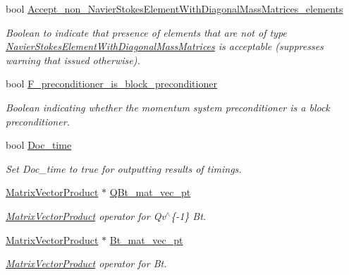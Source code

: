 \begin{DoxyCompactItemize}
bool \hyperlink{classoomph_1_1NavierStokesSchurComplementPreconditioner_a31a0119eae85695e267b2b0e6d58cfe6}{Accept\+\_\+non\+\_\+\+Navier\+Stokes\+Element\+With\+Diagonal\+Mass\+Matrices\+\_\+elements}
\begin{DoxyCompactList}\small\item\em Boolean to indicate that presence of elements that are not of type \hyperlink{classoomph_1_1NavierStokesElementWithDiagonalMassMatrices}{Navier\+Stokes\+Element\+With\+Diagonal\+Mass\+Matrices} is acceptable (suppresses warning that issued otherwise). \end{DoxyCompactList}\item 
bool \hyperlink{classoomph_1_1NavierStokesSchurComplementPreconditioner_ad3e3b6635c1524d8413a75642e4bc4e1}{F\+\_\+preconditioner\+\_\+is\+\_\+block\+\_\+preconditioner}
\begin{DoxyCompactList}\small\item\em Boolean indicating whether the momentum system preconditioner is a block preconditioner. \end{DoxyCompactList}\item 
bool \hyperlink{classoomph_1_1NavierStokesSchurComplementPreconditioner_a0b551f53464a6331d3b0f3da61d712ff}{Doc\+\_\+time}
\begin{DoxyCompactList}\small\item\em Set Doc\+\_\+time to true for outputting results of timings. \end{DoxyCompactList}\item 
\hyperlink{classoomph_1_1MatrixVectorProduct}{Matrix\+Vector\+Product} $\ast$ \hyperlink{classoomph_1_1NavierStokesSchurComplementPreconditioner_a7d88aae7807a9a8d07491dda4c8c2465}{Q\+Bt\+\_\+mat\+\_\+vec\+\_\+pt}
\begin{DoxyCompactList}\small\item\em \hyperlink{classoomph_1_1MatrixVectorProduct}{Matrix\+Vector\+Product} operator for Qv$^\wedge$\{-\/1\} Bt. \end{DoxyCompactList}\item 
\hyperlink{classoomph_1_1MatrixVectorProduct}{Matrix\+Vector\+Product} $\ast$ \hyperlink{classoomph_1_1NavierStokesSchurComplementPreconditioner_ad7bc578498d001d81223b37badefb44b}{Bt\+\_\+mat\+\_\+vec\+\_\+pt}
\begin{DoxyCompactList}\small\item\em \hyperlink{classoomph_1_1MatrixVectorProduct}{Matrix\+Vector\+Product} operator for Bt. \end{DoxyCompactList}\item 

\end{DoxyCompactItemize}
